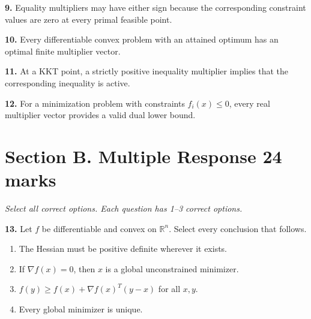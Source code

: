 \documentclass[11pt,a4paper]{article}
\begin{document}
\par\noindent\begin{minipage}{\linewidth}
\textbf{9.} Equality multipliers may have either sign because the corresponding constraint values are zero at every primal feasible point.
\end{minipage}\par\vspace{3mm}
\par\noindent\begin{minipage}{\linewidth}
\textbf{10.} Every differentiable convex problem with an attained optimum has an optimal finite multiplier vector.
\end{minipage}\par\vspace{3mm}
\par\noindent\begin{minipage}{\linewidth}
\textbf{11.} At a KKT point, a strictly positive inequality multiplier implies that the corresponding inequality is active.
\end{minipage}\par\vspace{3mm}
\par\noindent\begin{minipage}{\linewidth}
\textbf{12.} For a minimization problem with constraints \(f_i(x)\le0\), every real multiplier vector provides a valid dual lower bound.
\end{minipage}\par\vspace{3mm}
\newpage\section*{Section B. Multiple Response \hfill 24 marks}
\textit{Select all correct options. Each question has 1--3 correct options.}\par
\par\noindent\begin{minipage}{\linewidth}
\textbf{13.} Let \(f\) be differentiable and convex on \(\mathbb R^n\). Select every conclusion that follows.
\begin{enumerate}[label=(\Alph*),leftmargin=8mm,itemsep=2pt,topsep=2pt]
\item The Hessian must be positive definite wherever it exists.
\item If \(\nabla f(x)=0\), then \(x\) is a global unconstrained minimizer.
\item \(f(y)\ge f(x)+\nabla f(x)^T(y-x)\) for all \(x,y\).
\item Every global minimizer is unique.
\end{enumerate}

\end{minipage}\par\vspace{3mm}
\end{document}
